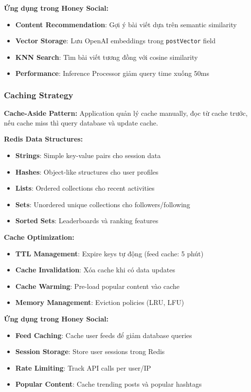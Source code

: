 \textbf{Ứng dụng trong Honey Social:}
\begin{itemize}
\item \textbf{Content Recommendation}: Gợi ý bài viết dựa trên semantic similarity
\item \textbf{Vector Storage}: Lưu OpenAI embeddings trong \texttt{postVector} field
\item \textbf{KNN Search}: Tìm bài viết tương đồng với cosine similarity
\item \textbf{Performance}: Inference Processor giảm query time xuống 50ms
\end{itemize}

\subsubsection{Caching Strategy}
\textbf{Cache-Aside Pattern:}
Application quản lý cache manually, đọc từ cache trước, nếu cache miss thì query database và update cache.

\textbf{Redis Data Structures:}
\begin{itemize}
\item \textbf{Strings}: Simple key-value pairs cho session data
\item \textbf{Hashes}: Object-like structures cho user profiles
\item \textbf{Lists}: Ordered collections cho recent activities
\item \textbf{Sets}: Unordered unique collections cho followers/following
\item \textbf{Sorted Sets}: Leaderboards và ranking features
\end{itemize}

\textbf{Cache Optimization:}
\begin{itemize}
\item \textbf{TTL Management}: Expire keys tự động (feed cache: 5 phút)
\item \textbf{Cache Invalidation}: Xóa cache khi có data updates
\item \textbf{Cache Warming}: Pre-load popular content vào cache
\item \textbf{Memory Management}: Eviction policies (LRU, LFU)
\end{itemize}

\textbf{Ứng dụng trong Honey Social:}
\begin{itemize}
\item \textbf{Feed Caching}: Cache user feeds để giảm database queries
\item \textbf{Session Storage}: Store user sessions trong Redis
\item \textbf{Rate Limiting}: Track API calls per user/IP
\item \textbf{Popular Content}: Cache trending posts và popular hashtags
\end{itemize}


